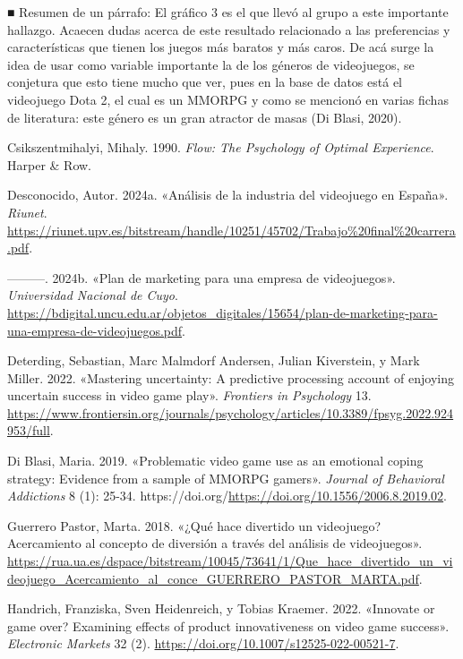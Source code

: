 \documentclass[
  letterpaper,
  DIV=11,
  numbers=noendperiod]{scrreprt}
\newlength{\cslhangindent}
\newlength{\cslentryspacingunit} %
\newenvironment{CSLReferences}[2] %
 {%
  \setlength{\parindent}{0pt}
  \ifodd #1
  \let\oldpar\par
  \def\par{\hangindent=\cslhangindent\oldpar}
  \fi
  \setlength{\parskip}{#2\cslentryspacingunit}
 }%
 {}
\begin{document}
■ Resumen de un párrafo: El gráfico 3 es el que llevó al grupo a este
importante hallazgo. Acaecen dudas acerca de este resultado relacionado
a las preferencias y características que tienen los juegos más baratos y
más caros. De acá surge la idea de usar como variable importante la de
los géneros de videojuegos, se conjetura que esto tiene mucho que ver,
pues en la base de datos está el videojuego Dota 2, el cual es un MMORPG
y como se mencionó en varias fichas de literatura: este género es un
gran atractor de masas (Di Blasi, 2020).

\hypertarget{refs}{}
\begin{CSLReferences}{1}{0}
\leavevmode{}%
Csikszentmihalyi, Mihaly. 1990. \emph{Flow: The Psychology of Optimal
Experience}. Harper \& Row.

\leavevmode{}%
Desconocido, Autor. 2024a. {«Análisis de la industria del videojuego en
España»}. \emph{Riunet}.
\url{https://riunet.upv.es/bitstream/handle/10251/45702/Trabajo\%20final\%20carrera.pdf}.

\leavevmode{}%
---------. 2024b. {«Plan de marketing para una empresa de videojuegos»}.
\emph{Universidad Nacional de Cuyo}.
\url{https://bdigital.uncu.edu.ar/objetos_digitales/15654/plan-de-marketing-para-una-empresa-de-videojuegos.pdf}.

\leavevmode{}%
Deterding, Sebastian, Marc Malmdorf Andersen, Julian Kiverstein, y Mark
Miller. 2022. {«Mastering uncertainty: A predictive processing account
of enjoying uncertain success in video game play»}. \emph{Frontiers in
Psychology} 13.
\url{https://www.frontiersin.org/journals/psychology/articles/10.3389/fpsyg.2022.924953/full}.

\leavevmode{}%
Di Blasi, Maria. 2019. {«Problematic video game use as an emotional
coping strategy: Evidence from a sample of MMORPG gamers»}.
\emph{Journal of Behavioral Addictions} 8 (1): 25-34.
https://doi.org/\url{https://doi.org/10.1556/2006.8.2019.02}.

\leavevmode{}%
Guerrero Pastor, Marta. 2018. {«¿Qué hace divertido un videojuego?
Acercamiento al concepto de diversión a través del análisis de
videojuegos»}.
\url{https://rua.ua.es/dspace/bitstream/10045/73641/1/Que_hace_divertido_un_videojuego_Acercamiento_al_conce_GUERRERO_PASTOR_MARTA.pdf}.

\leavevmode{}%
Handrich, Franziska, Sven Heidenreich, y Tobias Kraemer. 2022.
{«Innovate or game over? Examining effects of product innovativeness on
video game success»}. \emph{Electronic Markets} 32 (2).
\url{https://doi.org/10.1007/s12525-022-00521-7}.


\end{CSLReferences}
\end{document}
